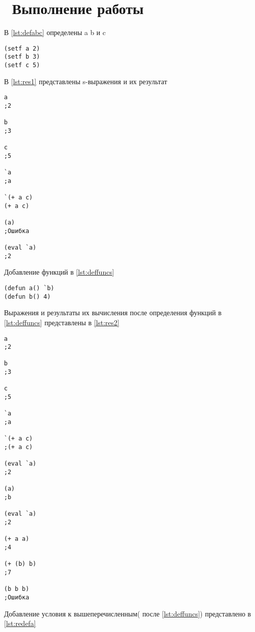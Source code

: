 \chapter{ Выполнение работы}
\label{cha:analysis}

В \ref{lst:defabc} определены a b и c

\begin{lstlisting}[style=lispStyle, caption={ Определения a b и c},
                    label={lst:defabc}]
(setf a 2)
(setf b 3)
(setf c 5)
\end{lstlisting}

В \ref{lst:res1} представлены s-выражения и их результат

\begin{lstlisting}[style=lispStyle, caption={ Выражения и их результат},
                    label={lst:res1}]
a
;2

b
;3

c
;5

`a
;a

`(+ a c)
(+ a c)

(a)
;Ошибка

(eval `a)
;2
\end{lstlisting}

Добавление функций в \ref{lst:deffuncs}


\begin{lstlisting}[style=lispStyle, caption={ Определение функций a и b},
                    label={lst:deffuncs}]
(defun a() `b)
(defun b() 4)
\end{lstlisting}

Выражения и результаты их вычисления после определения функций в \ref{lst:deffuncs} представлены в \ref{lst:res2}


\begin{lstlisting}[style=lispStyle, caption={ Выражения и их результаты},
                    label={lst:res2}]
a
;2

b
;3

c
;5

`a
;a

`(+ a c)
;(+ a c)

(eval `a)
;2

(a)
;b

(eval `a)
;2

(+ a a)
;4

(+ (b) b)
;7

(b b b)
;Ошибка
\end{lstlisting}

Добавление условия к вышеперечисленным( после \ref{lst:deffuncs}) представлено в \ref{lst:redefa}

